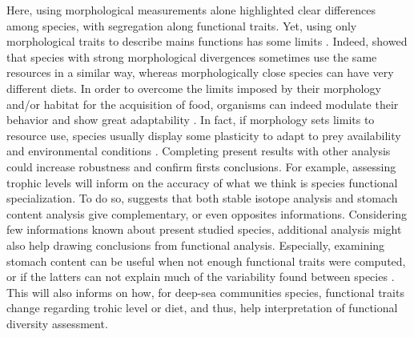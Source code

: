 Here, using morphological measurements alone highlighted clear differences among species, with segregation along functional traits. Yet, using only morphological traits to describe mains functions has some limits \citep{dasilva2019}. Indeed, \citet{grossman2009} showed that species with strong morphological divergences sometimes use the same resources in a similar way, whereas morphologically close species can have very different diets. In order to overcome the limits imposed by their morphology and/or habitat for the acquisition of food, organisms can indeed modulate their behavior and show great adaptability \citep{blondel1979,grossman2009}. In fact, if morphology sets limits to resource use, species usually display some plasticity to adapt to prey availability and environmental conditions \citep{ibanez2007,sibbing2000}. Completing present results with other analysis could increase robustness and confirm firsts conclusions. For example, assessing trophic levels will inform on the accuracy of what we think is species functional specialization. To do so, \citet{preciado2017} suggests that both stable isotope analysis and stomach content analysis give complementary, or even opposites informations. Considering few informations known about present studied species, additional analysis might also help drawing conclusions from functional analysis. Especially, examining stomach content can be useful when not enough functional traits were computed, or if the latters can not explain much of the variability found between species \citep{albouy2011}. This will also informs on how, for deep-sea communities species, functional traits change regarding trohic level or diet, and thus, help interpretation of functional diversity assessment. \\



